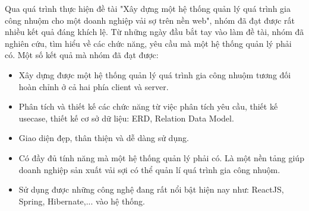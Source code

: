 Qua quá trình thực hiện đề tài "Xây dựng một hệ thống quản lý quá trình gia công nhuộm cho một doanh nghiệp vải sợ trên nền web", nhóm đã đạt được rất nhiều kết quả đáng khích lệ. Từ những ngày đầu bắt tay vào làm đề tài, nhóm đã nghiên cứu, tìm hiểu về các chức năng, yêu cầu mà một hệ thống quản lý phải có. Một số kết quả mà nhóm đã đạt được:

\begin{itemize}
    \item Xây dựng được một hệ thống quản lý quá trình gia công nhuộm tương đối hoàn chỉnh ở cả hai phía client và server.
    \item Phân tích và thiết kế các chức năng từ việc phân tích yêu cầu, thiết kế usecase, thiết kế cơ sở dữ liệu: ERD, Relation Data Model.
    \item Giao diện đẹp, thân thiện và dễ dàng sử dụng.
    \item Có đầy đủ tính năng mà một hệ thống  quản lý phải có. Là một nền tảng giúp doanh nghiệp sản xuất vải sợi có thể quản lí quá trình gia công nhuộm.
    \item Sử dụng được những công nghệ đang rất nổi bật hiện nay như: ReactJS, Spring, Hibernate,... vào hệ thống.
\end{itemize}